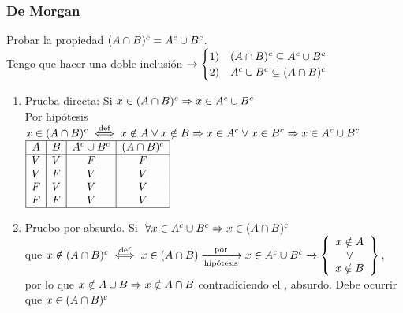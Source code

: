 \subsubsection*{De Morgan}
Probar la propiedad $(A \cap B)^c = A^c \cup B^c$.\\
Tengo que hacer una doble inclusión
$\to \begin{cases}
		1) & (A \cap B)^c \subseteq A^c \cup B^c \\
		2) & A^c \cup B^c \subseteq (A \cap B)^c
	\end{cases}
$
\begin{enumerate}[label=\arabic*)]
	\item Prueba directa: Si $x \in (A \cap B)^c \Rightarrow x \in A^c \cup B^c $\\
	      Por hipótesis $x \in (A \cap B)^c \stackrel{\text{def}}{\iff} x \notin A \lor x \notin B
		      \Rightarrow x \in A^c \lor x \in B^c \Rightarrow x \in A^c \cup B^c$\\
	      $\begin{array}{|c|c|c|c|}
			      \hline
			      A & B & A^c \cup B^c & (A \cap B)^c \\ \hline
			      V & V & F              & F              \\
			      V & F & V              & V              \\
			      F & V & V              & V              \\
			      F & F & V              & V              \\ \hline
		      \end{array}
	      $


	\item Pruebo por absurdo. Si $\;\forall x \in A^c \cup B^c \Rightarrow x \in (A \cap B)^c$\\
	       que $ x \notin (A \inter B)^c \stacktext{def}{\sisolosi} x \en (A \inter B) \flecha{por}[hipótesis] x \en A^c \union B^c \to
		      \llaves{c}{
			      x \notin A\\
			      \o \\
			      x \notin B\\
		      }$, por lo que $x \notin A \cup B \Rightarrow x \notin A \cap B$ contradiciendo el , absurdo. Debe ocurrir que $x \in (A \cap B)^c   $


\end{enumerate}
